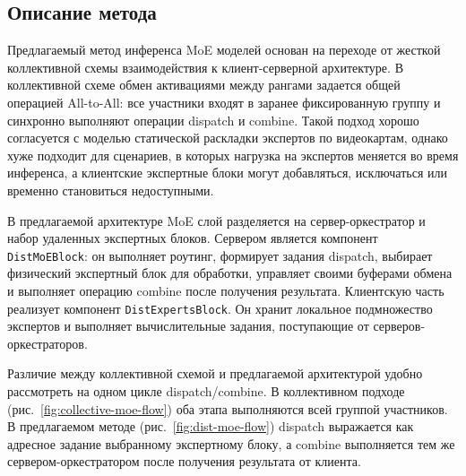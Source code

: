 \subsection{Описание метода}

Предлагаемый метод инференса MoE моделей основан на переходе от жесткой коллективной схемы взаимодействия к клиент-серверной архитектуре. В коллективной схеме обмен активациями между рангами задается общей операцией All-to-All: все участники входят в заранее фиксированную группу и синхронно выполняют операции dispatch и combine. Такой подход хорошо согласуется с моделью статической раскладки экспертов по видеокартам, однако хуже подходит для сценариев, в которых нагрузка на экспертов меняется во время инференса, а клиентские экспертные блоки могут добавляться, исключаться или временно становиться недоступными.

В предлагаемой архитектуре MoE слой разделяется на сервер-оркестратор и набор удаленных экспертных блоков. Сервером является компонент \texttt{DistMoEBlock}: он выполняет роутинг, формирует задания dispatch, выбирает физический экспертный блок для обработки, управляет своими буферами обмена и выполняет операцию combine после получения результата. Клиентскую часть реализует компонент \texttt{DistExpertsBlock}. Он хранит локальное подмножество экспертов и выполняет вычислительные задания, поступающие от серверов-оркестраторов.

Различие между коллективной схемой и предлагаемой архитектурой удобно рассмотреть на одном цикле dispatch/combine. В коллективном подходе (рис.~\ref{fig:collective-moe-flow}) оба этапа выполняются всей группой участников. В предлагаемом методе (рис.~\ref{fig:dist-moe-flow}) dispatch выражается как адресное задание выбранному экспертному блоку, а combine выполняется тем же сервером-оркестратором после получения результата от клиента.

